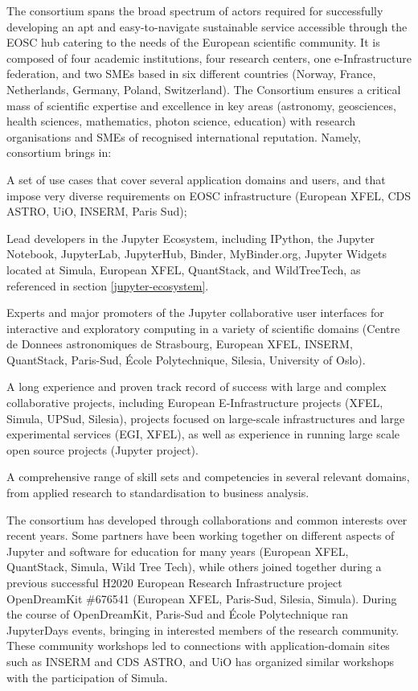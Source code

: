 The \TheProject consortium spans the broad spectrum of actors required
for successfully developing an apt and easy-to-navigate sustainable service
accessible through the EOSC hub catering to the needs of the European
scientific community. It is composed of four academic institutions, four research
centers, one e-Infrastructure federation, and two SMEs based in six different countries (Norway, France,
Netherlands, Germany, Poland, Switzerland).
The Consortium ensures a critical mass of scientific expertise and excellence
in key areas (astronomy, geosciences, health sciences,
mathematics, photon science, education) with research organisations and SMEs of recognised
 international reputation. Namely, \TheProject consortium brings in:
\begin{compactitem}
\item A set of use cases that cover several application domains and users, and that impose very diverse
requirements on EOSC infrastructure (European XFEL, CDS ASTRO, UiO, INSERM, Paris Sud);
\item Lead developers in the Jupyter Ecosystem, including IPython, the Jupyter Notebook, JupyterLab,
JupyterHub, Binder, MyBinder.org, Jupyter Widgets located at Simula, European XFEL, QuantStack, and
WildTreeTech,
as referenced in section \ref{jupyter-ecosystem}.
\item Experts and major promoters of the Jupyter collaborative user interfaces for interactive and exploratory
computing in a variety of scientific domains (Centre de Donnees
astronomiques de Strasbourg, European XFEL,
INSERM, QuantStack, Paris-Sud, \'Ecole Polytechnique, Silesia,
University of Oslo).
\item A long experience and proven track record of success with large and complex collaborative projects,
including
European E-Infrastructure projects (XFEL, Simula, UPSud, Silesia),
projects focused on large-scale infrastructures and large experimental services (EGI, XFEL),
as well as experience in running large scale open source projects (Jupyter project).
\item A comprehensive range of skill sets and competencies in several relevant domains, from applied
research to standardisation to business
analysis.
\end{compactitem}

The consortium has developed through collaborations and common interests over recent years.
Some partners have been working together on different aspects of Jupyter
and software for education for many years (European XFEL, QuantStack, Simula, Wild Tree Tech),
while others joined together during a previous successful
H2020 European Research Infrastructure project OpenDreamKit \#676541 (European XFEL,
Paris-Sud, Silesia, Simula).
During the course of OpenDreamKit, Paris-Sud and \'Ecole Polytechnique
ran JupyterDays events, bringing in interested members of the research community.
These community workshops led to connections with application-domain sites such as INSERM and CDS
ASTRO,
and UiO has organized similar workshops with the participation of Simula.

